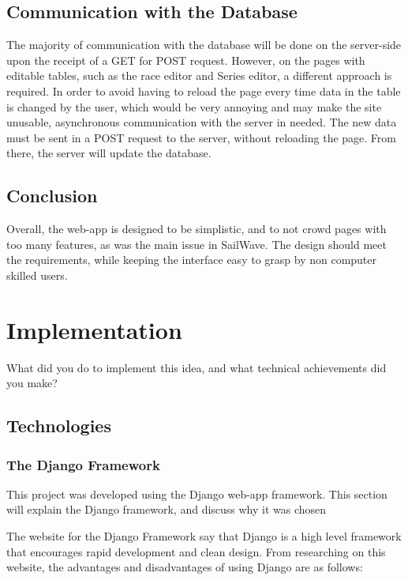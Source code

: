 \documentclass{l4proj}
\begin{document}
\section{Communication with the Database}

The majority of communication with the database will be done on the server-side upon the receipt of a GET for POST request. However, on the pages with editable tables, such as the race editor and Series editor, a different approach is required. In order to avoid having to reload the page every time data in the table is changed by the user, which would be very annoying and may make the site unusable, asynchronous communication with the server in needed. The new data must be sent in a POST request to the server, without reloading the page. From there, the server will update the database.

\section{Conclusion}

Overall, the web-app is designed to be simplistic, and to not crowd pages with too many features, as was the main issue in SailWave. The design should meet the requirements, while keeping the interface easy to grasp by non computer skilled users.


\chapter{Implementation}\label{chap:imp}
What did you do to implement this idea, and what technical achievements did you make?
\section{Technologies}

\subsection{The Django Framework}
This project was developed using the Django web-app framework. This section will explain the Django framework, and discuss why it was chosen

The website for the Django Framework \citep{django} say that Django is a high level framework that encourages rapid development and clean design. From researching on this website, the advantages and disadvantages of using Django are as follows:
\end{document}
